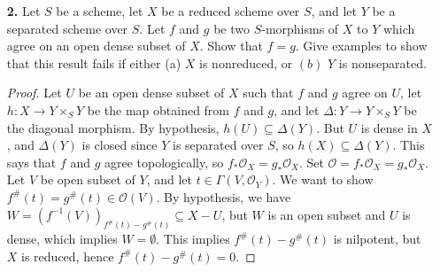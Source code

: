 \documentclass{article}
\newcommand{\OO}{\mathscr{O}}
\DeclareMathOperator{\spec}{Spec}
\begin{document}
\begin{enumerate} [label=\textbf{\arabic*.}, leftmargin=0em]
\begin{proof}
    It follows from these lemmas that if $f : A \to B$ is integral and $C$ is any $A$-algebra, then the mapping $(f \otimes 1)^* : \text{Spec}(B \otimes_A C) \to \spec{C}$ is a closed map. Let $f : X \to Y$ be a finite morphism of schemes. A finite morphism is an affine morphism (Ex. 3.4), so by (4.6f) we reduce to the case when $X = \spec{B}$ and $Y = \spec{A}$, where $B$ is a finite $A$-module (hence integral over $A$), and $f$ is induced by a ring homomorphism $A \to B$. Morphisms between affine schemes are separated (4.1), and finite morphisms are of finite type, so it remains to show $f$ is universally closed. If $Y' \to Y$ is any morphism, then we want to show $X \times_Y Y' \to Y'$ is a closed mapping. There is an open cover of $Y'$ by spectra of $A$-algebras $C_i$ so that the fiber product $X \times_Y Y'$ is covered by spectra of $B \otimes_A C_i$. By the above remarks, the morphisms $\text{Spec}(B \otimes_A C_i) \to \spec{C_i}$ are closed, hence $X \times_Y Y' \to Y'$ is closed.
\end{proof}

\item[\textbf{2.}] Let $S$ be a scheme, let $X$ be a reduced scheme over $S$, and let $Y$ be a separated scheme over $S$. Let $f$ and $g$ be two $S$-morphisms of $X$ to $Y$ which agree on an open dense subset of $X$. Show that $f = g$. Give examples to show that this result fails if either (a) $X$ is nonreduced, or $(b)$ $Y$ is nonseparated.

\begin{proof}
    Let $U$ be an open dense subset of $X$ such that $f$ and $g$ agree on $U$, let $h : X \to Y \times_S Y$ be the map obtained from $f$ and $g$, and let $\Delta : Y \to Y \times_S Y$ be the diagonal morphism. By hypothesis, $h(U) \subseteq \Delta(Y)$. But $U$ is dense in $X$, and $\Delta(Y)$ is closed since $Y$ is separated over $S$, so $h(X) \subseteq \Delta(Y)$. This says that $f$ and $g$ agree topologically, so $f_*\OO_X = g_*\OO_X$. Set $\OO = f_* \OO_X = g_*\OO_X$. Let $V$ be open subset of $Y$, and let $t \in \Gamma(V, \OO_Y)$. We want to show $f^\#(t) = g^\#(t) \in \OO(V)$. By hypothesis, we have $W = (f^{-1}(V))_{f^\#(t) - g^\#(t)} \subseteq X - U$, but $W$ is an open subset and $U$ is dense, which implies $W = \emptyset$. This implies $f^\#(t) - g^\#(t)$ is nilpotent, but $X$ is reduced, hence $f^\#(t) - g^\#(t) = 0$.


\end{proof}
\end{enumerate}
\end{document}
